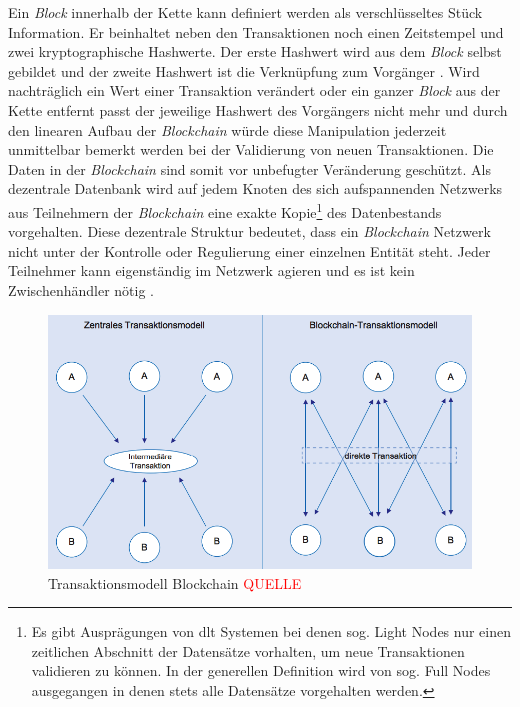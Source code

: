 Ein \textit{Block} innerhalb der Kette kann definiert werden als verschlüsseltes Stück Information. Er beinhaltet neben den Transaktionen noch einen Zeitstempel und zwei kryptographische Hashwerte. Der erste Hashwert wird aus dem \textit{Block} selbst gebildet und der zweite Hashwert ist die Verknüpfung zum Vorgänger \citep{Tschorsch2016}. Wird nachträglich ein Wert einer Transaktion verändert oder ein ganzer \textit{Block} aus der Kette entfernt passt der jeweilige Hashwert des Vorgängers nicht mehr und durch den linearen Aufbau der \textit{Blockchain} würde diese Manipulation jederzeit unmittelbar bemerkt werden bei der Validierung von neuen Transaktionen. Die Daten in der \textit{Blockchain} sind somit vor unbefugter Veränderung geschützt. Als dezentrale Datenbank wird auf jedem Knoten des sich aufspannenden Netzwerks aus Teilnehmern der \textit{Blockchain} eine exakte Kopie\footnote{Es gibt Ausprägungen von \ac{dlt} Systemen bei denen sog. Light Nodes nur einen zeitlichen Abschnitt der Datensätze vorhalten, um neue Transaktionen validieren zu können. In der generellen Definition wird von sog. Full Nodes ausgegangen in denen stets alle Datensätze vorgehalten werden.} des Datenbestands vorgehalten. Diese dezentrale Struktur bedeutet, dass ein \textit{Blockchain} Netzwerk nicht unter der Kontrolle oder Regulierung einer einzelnen Entität steht. Jeder Teilnehmer kann eigenständig im Netzwerk agieren und es ist kein Zwischenhändler nötig \citep{Drescher2017, Meier2018}.

\begin{figure}[H]
	\centering
	\includegraphics[width=1.0\linewidth]{pictures/change-in-transaction-model-blockchain}
	\caption[Transaktionsmodell Blockchain]{Transaktionsmodell Blockchain \textcolor{red}{QUELLE}}
	\label{fig:change-in-transaction-model-blockchain}
\end{figure}

